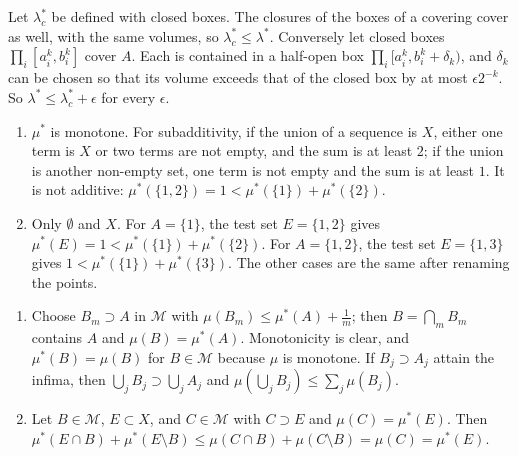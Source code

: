 \section{}

Let $\lambda^*_c$ be defined with closed boxes. The closures of the
boxes of a covering cover as well, with the same volumes, so
$\lambda^*_c\leq\lambda^*$. Conversely let closed boxes
$\prod_i[a_i^k, b_i^k]$ cover $A$. Each is contained in a half-open
box $\prod_i[a_i^k, b_i^k + \delta_k)$, and $\delta_k$ can be chosen
so that its volume exceeds that of the closed box by at most
$\epsilon2^{-k}$. So $\lambda^*\leq\lambda^*_c + \epsilon$ for every
$\epsilon$.

\begin{enumerate}[nosep]
  \item $\mu^*$ is monotone. For subadditivity, if the union of a
        sequence is $X$, either one term is $X$ or two terms are not
        empty, and the sum is at least $2$; if the union is another
        non-empty set, one term is not empty and the sum is at least
        $1$. It is not additive:
        $\mu^*(\{1, 2\}) = 1 < \mu^*(\{1\}) + \mu^*(\{2\})$.
  \item Only $\emptyset$ and $X$. For $A = \{1\}$, the test set
        $E = \{1, 2\}$ gives
        $\mu^*(E) = 1 < \mu^*(\{1\}) + \mu^*(\{2\})$. For
        $A = \{1, 2\}$, the test set $E = \{1, 3\}$ gives
        $1 < \mu^*(\{1\}) + \mu^*(\{3\})$. The other cases are the
        same after renaming the points.
\end{enumerate}

\begin{enumerate}[nosep]
  \item Choose $B_m\supset A$ in $\mathcal M$ with
        $\mu(B_m)\leq\mu^*(A) + \frac1m$; then $B = \bigcap_mB_m$
        contains $A$ and $\mu(B) = \mu^*(A)$. Monotonicity is clear,
        and $\mu^*(B) = \mu(B)$ for $B\in\mathcal M$ because $\mu$ is
        monotone. If $B_j\supset A_j$ attain the infima, then
        $\bigcup_jB_j\supset\bigcup_jA_j$ and
        $\mu(\bigcup_jB_j)\leq\sum_j\mu(B_j)$.
  \item Let $B\in\mathcal M$, $E\subset X$, and $C\in\mathcal M$ with
        $C\supset E$ and $\mu(C) = \mu^*(E)$. Then
        $\mu^*(E\cap B) + \mu^*(E\setminus B)
        \leq\mu(C\cap B) + \mu(C\setminus B) = \mu(C) = \mu^*(E)$.
\end{enumerate}

